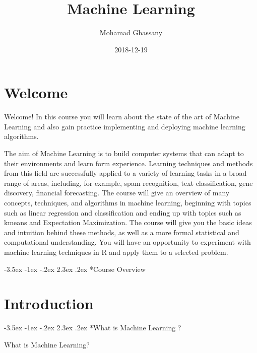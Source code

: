 \documentclass[]{book}
\title{Machine Learning}
\author{Mohamad Ghassany}
\date{2018-12-19}
\makeatletter
\renewcommand\section{\@startsection {section}{1}{\z@}%
                                   {-3.5ex \@plus -1ex \@minus -.2ex}%
                                   {2.3ex \@plus.2ex}%
                                   {\normalfont\Large\bfseries\color{ForestGreen}}}
\theoremstyle{definition}
\theoremstyle{definition}
\theoremstyle{definition}
\theoremstyle{remark}
\makeatother
\begin{document}
\maketitle

{
\setcounter{tocdepth}{2}
\tableofcontents
}
\chapter*{Welcome}\label{welcome}

Welcome! In this course you will learn about the state of the art of
Machine Learning and also gain practice implementing and deploying
machine learning algorithms.

The aim of Machine Learning is to build computer systems that can adapt
to their environments and learn form experience. Learning techniques and
methods from this field are successfully applied to a variety of
learning tasks in a broad range of areas, including, for example, spam
recognition, text classification, gene discovery, financial forecasting.
The course will give an overview of many concepts, techniques, and
algorithms in machine learning, beginning with topics such as linear
regression and classification and ending up with topics such as kmeans
and Expectation Maximization. The course will give you the basic ideas
and intuition behind these methods, as well as a more formal statistical
and computational understanding. You will have an opportunity to
experiment with machine learning techniques in R and apply them to a
selected problem.

\section*{Course Overview}\label{course-overview}

\chapter*{Introduction}\label{introduction}

\section*{What is Machine Learning ?}\label{what-is-machine-learning}

What is Machine Learning?
\end{document}
